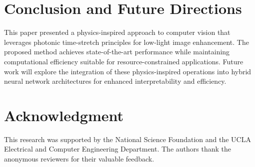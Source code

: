\documentclass[journal,transmag]{IEEEtran}
\begin{document}
\section{Conclusion and Future Directions}

This paper presented a physics-inspired approach to computer vision that leverages photonic time-stretch principles for low-light image enhancement. The proposed method achieves state-of-the-art performance while maintaining computational efficiency suitable for resource-constrained applications. Future work will explore the integration of these physics-inspired operations into hybrid neural network architectures for enhanced interpretability and efficiency.

\section*{Acknowledgment}

This research was supported by the National Science Foundation and the UCLA Electrical and Computer Engineering Department. The authors thank the anonymous reviewers for their valuable feedback.
\end{document}
